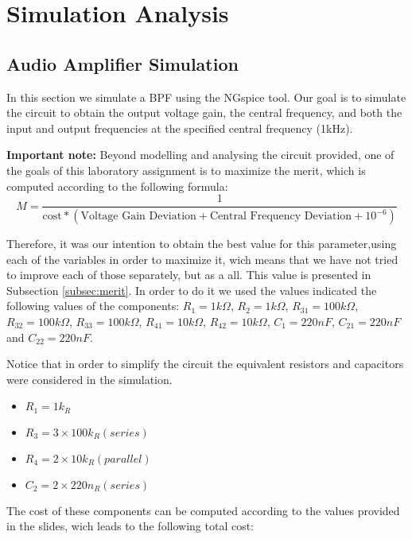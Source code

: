 \section{Simulation Analysis}
\label{sec:simulation}

\subsection{Audio Amplifier Simulation}
\label{subsec:amp_simulation}
\par In this section we simulate a BPF using the NGspice tool. Our goal is to simulate the circuit to obtain the output voltage gain, the central frequency, and both the input and output frequencies at the specified central frequency (1kHz).

\par  \textbf{Important note:} Beyond modelling and analysing the circuit provided, one of the goals of this laboratory assignment is to maximize the merit, which is computed according to the following formula:
\begin{equation}
M = \frac{1}{\text{cost}*(\text{Voltage Gain Deviation}+\text{Central Frequency Deviation}+10^{-6})}
\label{eq:merit}
\end{equation}

\par Therefore, it was our intention to obtain the best value for this parameter,using each of the variables in order to maximize it, wich means that we have not tried to improve each of those separately, but as a all. This value is presented in Subsection \ref{subsec:merit}.
In order to do it we used the values indicated the following values of the components: $R_{1}=1k\Omega$, $R_{2}=1k\Omega$, $R_{31}=100k\Omega$, $R_{32}=100k\Omega$, $R_{33}=100k\Omega$, $R_{41}=10k\Omega$, $R_{42}=10k\Omega$, $C_{1}=220nF$, $C_{21}=220nF$ and $C_{22}=220nF$. 

\par Notice that in order to simplify the circuit the equivalent resistors and capacitors were considered in the simulation.
\begin{itemize}
\item $R_{1} = 1k_{ R}$
\item $R_{3} = 3 \times 100k_{ R} (series)$
\item $R_{4} = 2 \times 10k_{ R} (parallel)$
\item $C_{2} = 2 \times 220n_{ R} (series)$
\end{itemize}

The cost of these components can be computed according to the values provided in the slides, wich leads to the following total cost:

